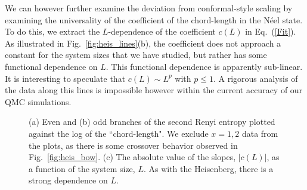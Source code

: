 \documentclass[prl,aps,twocolumn,floatfix,amsmath,amssymb,superscriptaddress,tightenlines]{revtex4}
\begin{document}
We can however further examine the deviation from conformal-style scaling by examining the universality of the 
coefficient of the chord-length in the N\'eel state.
To do this, we extract the $L$-dependence of the coefficient $c(L)$ in Eq.~(\ref{Fit}).  As illustrated in Fig.~\ref{fig:heis_lines}(b),
the coefficient does not approach a constant for the system sizes that we have studied, but rather has some functional dependence on $L$.
This functional dependence is apparently sub-linear.  It is interesting to speculate that $c(L) \sim L^p$ with $p\leq1$.  A rigorous analysis of the data along this lines is impossible however within the current
accuracy of our QMC simulations.


 \begin{figure}
   \begin{center}
   \end{center}
   \caption{(a) Even and (b) odd branches of the second Renyi entropy plotted against the log of the ``chord-length". We exclude $x=1,2$ data from the plots, as there is some crossover behavior observed in Fig.~\ref{fig:heis_bow}. (c) The absolute value of the slopes, $|c(L)|$, as a function of the system size, $L$. As with the Heisenberg, there is a strong dependence on $L$.}
   \label{fig:2}
 \end{figure}
\end{document}
